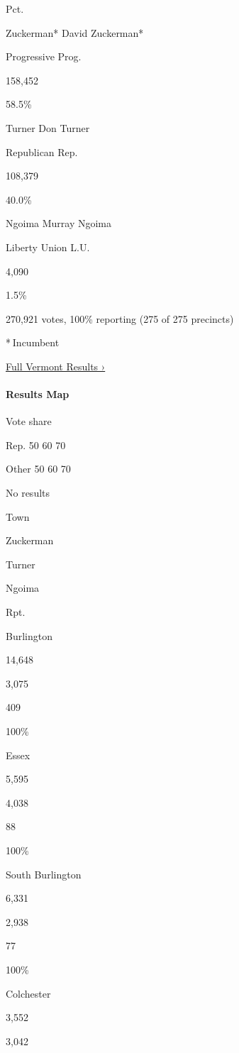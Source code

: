 Pct.

 Zuckerman* David Zuckerman*

Progressive Prog.

158,452

58.5\%

 Turner Don Turner

Republican Rep.

108,379

40.0\%

 Ngoima Murray Ngoima

Liberty Union L.U.

4,090

1.5\%

270,921 votes, 100\% reporting (275 of 275 precincts)

* Incumbent

\href{https://www.nytimes3xbfgragh.onion/interactive/2018/11/06/us/elections/results-vermont-elections.html}{Full
Vermont Results ›}

\hypertarget{results-map-3}{%
\paragraph{Results Map}\label{results-map-3}}

Vote share

Rep. 50 60 70

Other 50 60 70

No results

Town

Zuckerman

Turner

Ngoima

Rpt.

Burlington

14,648

3,075

409

100\%

Essex

5,595

4,038

88

100\%

South Burlington

6,331

2,938

77

100\%

Colchester

3,552

3,042


